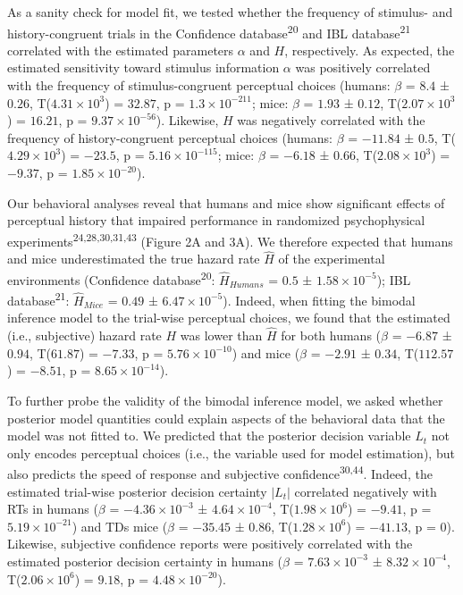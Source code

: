 \documentclass[
]{article}
\begin{document}
As a sanity check for model fit, we tested whether the frequency of
stimulus- and history-congruent trials in the Confidence
database\textsuperscript{20} and IBL database\textsuperscript{21}
correlated with the estimated parameters \(\alpha\) and \(H\),
respectively. As expected, the estimated sensitivity toward stimulus
information \(\alpha\) was positively correlated with the frequency of
stimulus-congruent perceptual choices (humans: \(\beta\) = \(8.4\) ±
\(0.26\), T(\(\ensuremath{4.31\times 10^{3}}\)) = \(32.87\), p =
\(\ensuremath{1.3\times 10^{-211}}\); mice: \(\beta\) = \(1.93\) ±
\(0.12\), T(\(\ensuremath{2.07\times 10^{3}}\)) = \(16.21\), p =
\(\ensuremath{9.37\times 10^{-56}}\)). Likewise, \(H\) was negatively
correlated with the frequency of history-congruent perceptual choices
(humans: \(\beta\) = \(-11.84\) ± \(0.5\),
T(\(\ensuremath{4.29\times 10^{3}}\)) = \(-23.5\), p =
\(\ensuremath{5.16\times 10^{-115}}\); mice: \(\beta\) = \(-6.18\) ±
\(0.66\), T(\(\ensuremath{2.08\times 10^{3}}\)) = \(-9.37\), p =
\(\ensuremath{1.85\times 10^{-20}}\)).

Our behavioral analyses reveal that humans and mice show significant
effects of perceptual history that impaired performance in randomized
psychophysical experiments\textsuperscript{24,28,30,31,43} (Figure 2A
and 3A). We therefore expected that humans and mice underestimated the
true hazard rate \(\hat{H}\) of the experimental environments
(Confidence database\textsuperscript{20}: \(\hat{H}_{Humans}\) = \(0.5\)
± \(\ensuremath{1.58\times 10^{-5}}\)); IBL
database\textsuperscript{21}: \(\hat{H}_{Mice}\) = \(0.49\) ±
\(\ensuremath{6.47\times 10^{-5}}\)). Indeed, when fitting the bimodal
inference model to the trial-wise perceptual choices, we found that the
estimated (i.e., subjective) hazard rate \(H\) was lower than
\(\hat{H}\) for both humans (\(\beta\) = \(-6.87\) ± \(0.94\),
T(\(61.87\)) = \(-7.33\), p = \(\ensuremath{5.76\times 10^{-10}}\)) and
mice (\(\beta\) = \(-2.91\) ± \(0.34\), T(\(112.57\)) = \(-8.51\), p =
\(\ensuremath{8.65\times 10^{-14}}\)).

To further probe the validity of the bimodal inference model, we asked
whether posterior model quantities could explain aspects of the
behavioral data that the model was not fitted to. We predicted that the
posterior decision variable \(L_t\) not only encodes perceptual choices
(i.e., the variable used for model estimation), but also predicts the
speed of response and subjective confidence\textsuperscript{30,44}.
Indeed, the estimated trial-wise posterior decision certainty \(|L_t|\)
correlated negatively with RTs in humans (\(\beta\) =
\(\ensuremath{-4.36\times 10^{-3}}\) ±
\(\ensuremath{4.64\times 10^{-4}}\),
T(\(\ensuremath{1.98\times 10^{6}}\)) = \(-9.41\), p =
\(\ensuremath{5.19\times 10^{-21}}\)) and TDs mice (\(\beta\) =
\(-35.45\) ± \(0.86\), T(\(\ensuremath{1.28\times 10^{6}}\)) =
\(-41.13\), p = \(0\)). Likewise, subjective confidence reports were
positively correlated with the estimated posterior decision certainty in
humans (\(\beta\) = \(\ensuremath{7.63\times 10^{-3}}\) ±
\(\ensuremath{8.32\times 10^{-4}}\),
T(\(\ensuremath{2.06\times 10^{6}}\)) = \(9.18\), p =
\(\ensuremath{4.48\times 10^{-20}}\)).
\end{document}
